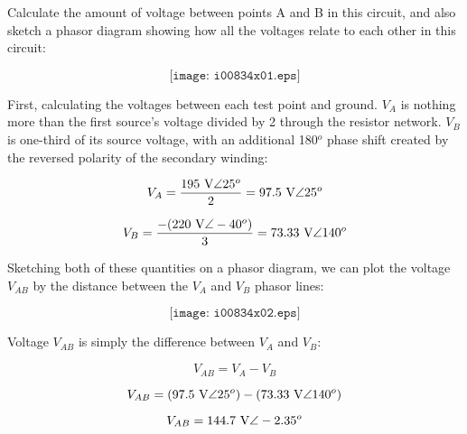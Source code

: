 

Calculate the amount of voltage between points A and B in this circuit, and also sketch a phasor diagram showing how all the voltages relate to each other in this circuit:

$$\texttt{[image: i00834x01.eps]}$$







First, calculating the voltages between each test point and ground.  $V_A$ is nothing more than the first source's voltage divided by 2 through the resistor network.  $V_B$ is one-third of its source voltage, with an additional 180$^{o}$ phase shift created by the reversed polarity of the secondary winding:

$$V_A = {195 \hbox{ V} \angle 25^o \over 2} = 97.5 \hbox{ V} \angle 25^o$$

$$V_B = {-(220 \hbox{ V} \angle -40^o) \over 3} = 73.33 \hbox{ V} \angle 140^o$$

Sketching both of these quantities on a phasor diagram, we can plot the voltage $V_{AB}$ by the distance between the $V_A$ and $V_B$ phasor lines:

$$\texttt{[image: i00834x02.eps]}$$

Voltage $V_{AB}$ is simply the difference between $V_A$ and $V_B$:

$$V_{AB} = V_A - V_B$$

$$V_{AB} = (97.5 \hbox{ V} \angle 25^o) - (73.33 \hbox{ V} \angle 140^o)$$

$$V_{AB} = 144.7 \hbox{ V} \angle -2.35^o$$











